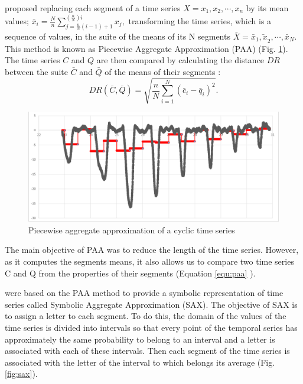 \cite{keogh2001dimensionality} proposed replacing each segment of a time series
$X=x_{1},x_{2},\cdots,x_{n}$ by its mean values;
$\bar{x}_{i}=\frac{N}{n}\sum_{j=\frac{n}{N}(i-1)+1}^{(\frac{n}{N})i}x_{j},$  transforming the time
series, which is a sequence of values, in the suite of the means of its N segments
$\bar{X}=\bar{x}_{1}\bar{,x}_{2},\cdots,\bar{x}_{N}.$ This method is known as Piecewise Aggregate
Approximation (PAA) (Fig. \ref{fig:paa}). The time series $C$ and $Q$ are then compared by calculating the distance $DR$
between the suite $\bar{C}$ and $\bar{Q}$ of the means of their segments :
\begin{equation}
DR(\bar{C},\bar{Q})=\sqrt{\frac{n}{N}\sum_{i=1}^{N}(\bar{c}_{i}-\bar{q}_{i})^{2}}.
\label{equ:paa}
\end{equation}

 \begin{figure}[h]
  \centering
   \includegraphics[scale=0.4]{images/sax-p/paa}
    \caption{Piecewise aggregate approximation of a cyclic time series}
  \label{fig:paa}
  \end{figure}

The main objective of PAA was to reduce the length of the time series. However, 
as it computes the segments means, it also allows us to compare two time series C and Q from 
the properties of their 
segments (Equation \ref{equ:paa} ).


\cite{lin2003symbolic} were based on the PAA method to provide a symbolic representation of time
series called Symbolic Aggregate Approximation (SAX). The objective of SAX is to assign a letter to
each segment. To do this, the domain of the values of the time series is divided into intervals
so that every point of the temporal series has approximately the same probability to belong to an 
interval and a letter is associated with each of these intervals.  Then each segment of the time
series is associated with the letter of the interval  to which belongs its average (Fig. \ref{fig:sax}).

